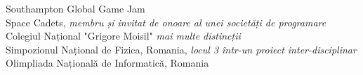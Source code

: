 
\bigskip
{}%
Southampton Global Game Jam\\
Space Cadets, \emph{membru și invitat de onoare al unei societăți de programare}\\
Colegiul Național "Grigore Moisil" \emph{mai multe distincții}\\
Simpozionul Național de Fizica, Romania, \emph{locul 3 într-un proiect inter-disciplinar}\\
Olimpliada Națională de Informatică, Romania \\
